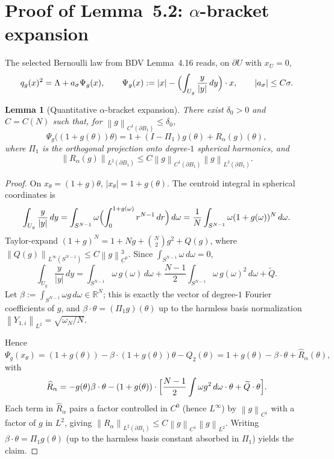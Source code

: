 \documentclass[11pt]{article}
\newtheorem{lemma}[theorem]{Lemma}
\theoremstyle{definition}
\newcommand{\R}{\mathbb{R}}
\renewcommand{\d}{\,d}
\newcommand{\norm}[1]{\left\|#1\right\|}
\newcommand{\abs}[1]{\left|#1\right|}
\begin{document}
\section{Proof of Lemma~5.2: $\alpha$-bracket expansion}\label{sec:lem52}

The selected Bernoulli law from BDV Lemma~4.16 reads, on $\partial U$ with
$x_U=0$,
\[
q_g(x)^2=\Lambda+a_\sigma\Psi_g(x),\qquad
\Psi_g(x):=\abs{x}-\Bigl(\int_{U_g}\frac{y}{\abs{y}}\d y\Bigr)\cdot x,
\qquad\abs{a_\sigma}\le C\sigma.
\]

\begin{lemma}[Quantitative $\alpha$-bracket expansion]\label{lem:5.2}
There exist $\delta_0>0$ and $C=C(N)$ such that, for
$\norm{g}_{C^{1}(\partial B_1)}\le\delta_0$,
\[
\Psi_g\bigl((1+g(\theta))\theta\bigr)
=1+(I-\Pi_1)g(\theta)+R_\alpha(g)(\theta),
\]
where $\Pi_1$ is the orthogonal projection onto degree-$1$ spherical
harmonics, and
\[
\norm{R_\alpha(g)}_{L^2(\partial B_1)}
\le C\norm{g}_{C^1(\partial B_1)}\norm{g}_{L^2(\partial B_1)}.
\]
\end{lemma}

\begin{proof}
On $x_\theta=(1+g)\theta$, $\abs{x_\theta}=1+g(\theta)$. The centroid
integral in spherical coordinates is
\[
\int_{U_g}\frac{y}{\abs{y}}\d y
=\int_{S^{N-1}}\omega\Bigl(\int_0^{1+g(\omega)}r^{N-1}\d r\Bigr)\d\omega
=\frac{1}{N}\int_{S^{N-1}}\omega(1+g(\omega))^N\d\omega.
\]
Taylor-expand $(1+g)^N=1+Ng+\binom{N}{2}g^2+Q(g)$, where
$\norm{Q(g)}_{L^\infty(S^{N-1})}\le C\norm{g}_{C^0}^3$. Since
$\int_{S^{N-1}}\omega\d\omega=0$,
\[
\int_{U_g}\frac{y}{\abs{y}}\d y
=\int_{S^{N-1}}\omega\,g(\omega)\d\omega
+\frac{N-1}{2}\int_{S^{N-1}}\omega\,g(\omega)^2\d\omega
+\widetilde Q.
\]
Let $\beta:=\int_{S^{N-1}}\omega g\d\omega\in\R^N$; this is exactly the
vector of degree-$1$ Fourier coefficients of $g$, and
$\beta\cdot\theta=(\Pi_1 g)(\theta)$ up to the harmless basis normalization
$\norm{Y_{1,i}}_{L^2}=\sqrt{\omega_N/N}$.

Hence
\[
\Psi_g(x_\theta)
=(1+g(\theta))-\beta\cdot(1+g(\theta))\theta-Q_2(\theta)
=1+g(\theta)-\beta\cdot\theta+\widehat R_\alpha(\theta),
\]
with
\[
\widehat R_\alpha
=-g(\theta)\beta\cdot\theta
-(1+g(\theta))\cdot\Bigl[\frac{N-1}{2}\int\omega g^2\,d\omega\cdot\theta+\widetilde Q\cdot\theta\Bigr].
\]
Each term in $\widehat R_\alpha$ pairs a factor controlled in $C^0$
(hence $L^\infty$) by $\norm{g}_{C^1}$ with a factor of $g$ in $L^2$, giving
$\norm{R_\alpha}_{L^2(\partial B_1)}\le C\norm{g}_{C^1}\norm{g}_{L^2}$.
Writing $\beta\cdot\theta=\Pi_1 g(\theta)$ (up to the harmless basis
constant absorbed in $\Pi_1$) yields the claim.
\end{proof}
\end{document}
